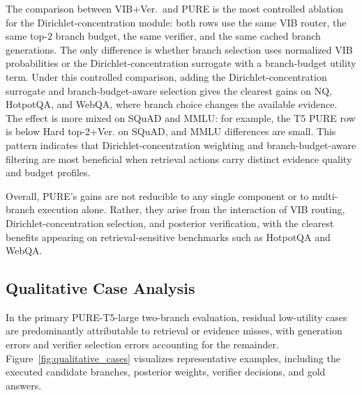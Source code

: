 \documentclass[a4paper,fleqn]{cas-dc}
\begin{document}
The comparison between VIB+Ver.\ and PURE is the most controlled ablation for the Dirichlet-concentration module: both rows use the same VIB router, the same top-$2$ branch budget, the same verifier, and the same cached branch generations. The only difference is whether branch selection uses normalized VIB probabilities or the Dirichlet-concentration surrogate with a branch-budget utility term. Under this controlled comparison, adding the Dirichlet-concentration surrogate and branch-budget-aware selection gives the clearest gains on NQ, HotpotQA, and WebQA, where branch choice changes the available evidence. The effect is more mixed on SQuAD and MMLU: for example, the T5 PURE row is below Hard top-2+Ver. on SQuAD, and MMLU differences are small. This pattern indicates that Dirichlet-concentration weighting and branch-budget-aware filtering are most beneficial when retrieval actions carry distinct evidence quality and budget profiles.

Overall, PURE's gains are not reducible to any single component or to multi-branch execution alone. Rather, they arise from the interaction of VIB routing, Dirichlet-concentration selection, and posterior verification, with the clearest benefits appearing on retrieval-sensitive benchmarks such as HotpotQA and WebQA.

\subsection{Qualitative Case Analysis}
\label{subsec:qualitative_case_analysis}

In the primary PURE-T5-large two-branch evaluation, residual low-utility cases are predominantly attributable to retrieval or evidence misses, with generation errors and verifier selection errors accounting for the remainder. Figure~\ref{fig:qualitative_cases} visualizes representative examples, including the executed candidate branches, posterior weights, verifier decisions, and gold answers.
\end{document}
